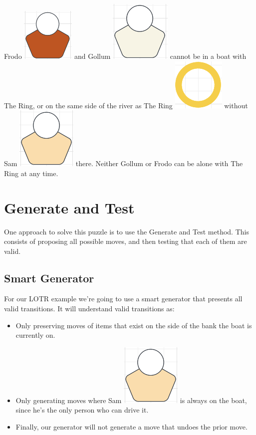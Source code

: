 \documentclass[
	letterpaper, %
]{jdf}
\begin{document}
\begin{Abstract}
Frodo \includegraphics[scale=0.7]{Figures/frodo.png} and Gollum  \includegraphics[scale=0.7]{Figures/gollum.png} cannot be in a boat with The Ring, or on the same side of the river as The Ring  \includegraphics[scale=0.7]{Figures/ring.png} without Sam  \includegraphics[scale=0.7]{Figures/sam.png} there. Neither Gollum or Frodo can be alone with The Ring at any time. 

\section{Generate and Test}
One approach to solve this puzzle is to use the Generate and Test method. This consists of proposing all possible moves, and then testing that each of them are valid. 

\subsection{Smart Generator}
For our LOTR example we're going to use a smart generator that presents all valid transitions. It will understand valid transitions as:
\begin{itemize}
\item Only preserving moves of items that exist on the side of the bank the boat is currently on. 
\item Only generating moves where Sam \includegraphics[scale=0.7]{Figures/sam.png} is always on the boat, since he's the only person who can drive it. 
\item Finally, our generator will not generate a move that undoes the prior move.
\end{itemize}


\end{Abstract}
\end{document}
